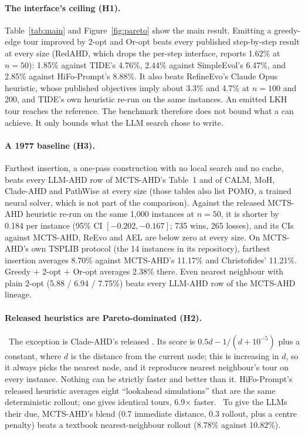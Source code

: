 \paragraph{The interface's ceiling (H1).} Table~\ref{tab:main} and Figure~\ref{fig:pareto} show the
main result. Emitting a greedy-edge tour improved by 2-opt and Or-opt beats every published step-by-step result at every size (RedAHD, which drops the per-step interface, reports 1.62\% at $n=50$): 1.85\% against TIDE's 4.76\%, 2.44\% against SimpleEvol's
6.47\%, and 2.85\% against HiFo-Prompt's 8.88\%. It also beats RefineEvo's Claude Opus heuristic,
whose published objectives imply about 3.3\% and 4.7\% at $n=100$ and 200, and TIDE's own heuristic
re-run on the same instances. An emitted LKH tour reaches the reference. The benchmark therefore
does not bound what a  can achieve. It only bounds what the LLM search
chose to write.

\paragraph{A 1977 baseline (H3).} Farthest insertion, a one-pass construction with no local search and no cache, beats every LLM-AHD row of MCTS-AHD's Table~1 and of CALM, MoH, Clade-AHD and PathWise at every size (those tables also list POMO, a trained neural solver, which is not part of the comparison).
Against the released MCTS-AHD heuristic re-run on the same 1,000 instances at $n=50$, it is shorter
by 0.184 per instance (95\% CI $[-0.202,-0.167]$; 735 wins, 265 losses), and its CIs against
MCTS-AHD, ReEvo and AEL are below zero at every size. On MCTS-AHD's own TSPLIB protocol (the 14
instances in its repository), farthest insertion averages 8.70\% against MCTS-AHD's 11.17\% and
Christofides' 11.21\%. Greedy + 2-opt + Or-opt averages 2.38\% there. Even nearest neighbour with plain 2-opt (5.88 / 6.94 / 7.75\%) beats every LLM-AHD row of the MCTS-AHD lineage.

\paragraph{Released heuristics are Pareto-dominated (H2).} \HtwoSentence\ The exception is
Clade-AHD's released . Its score is $0.5d - 1/(d+10^{-5})$ plus a constant, where $d$ is
the distance from the current node; this is increasing in $d$, so it always picks the nearest node,
and it reproduces nearest neighbour's tour on every instance. Nothing can be strictly faster and
better than it. HiFo-Prompt's released heuristic averages eight ``lookahead simulations'' that are
the same deterministic rollout; one gives identical tours, 6.9$\times$ faster. \NoCacheHtwo\ To give the LLMs their due, MCTS-AHD's blend (0.7 immediate distance, 0.3 rollout, plus a centre penalty) beats a textbook
nearest-neighbour rollout (8.78\% against 10.82\%).

